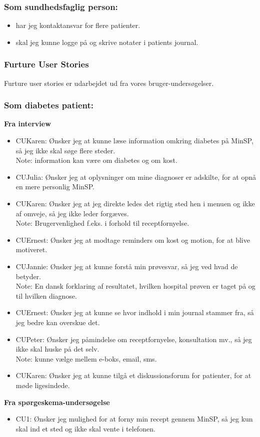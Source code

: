 \subsubsection*{Som sundhedsfaglig person:}
\begin{itemize}
\item har jeg kontaktansvar for flere patienter.
\item skal jeg kunne logge på og skrive notater i patients journal.
\end{itemize}
\subsubsection{Furture User Stories}
Furture user stories er udarbejdet ud fra vores bruger-undersøgelser.
\subsubsection*{Som diabetes patient:}
\textbf{Fra interview}\\
\begin{itemize}
\item CUKaren: Ønsker jeg at kunne læse information omkring diabetes på MinSP, så jeg ikke skal søge flere steder. \\
Note: information kan være om diabetes og om kost.
\item CUJulia: Ønsker jeg at oplysninger om mine diagnoser er adskilte, for at opnå en mere personlig MinSP. 
\item CUKaren: Ønsker jeg at jeg direkte ledes det rigtig sted hen i menuen og ikke af omveje, så jeg ikke leder forgæves.\\ 
Note: Brugervenlighed f.eks. i forhold til receptfornyelse.
\item CUErnest: Ønsker jeg at modtage reminders om kost og motion, for at blive motiveret.
\item CUJannie: Ønsker jeg at kunne forstå min prøvesvar, så jeg ved hvad de betyder. \\
Note: En dansk forklaring af resultatet, hvilken hospital prøven er taget på og til hvilken diagnose. 
\item CUErnest: Ønsker jeg at kunne se hvor indhold i min journal stammer fra, så jeg bedre kan overskue det.
\item CUPeter: Ønsker jeg påmindelse om receptfornyelse, konsultation mv., så jeg ikke skal huske på det selv.\\ 
Note: kunne vælge mellem e-boks, email, sms.
\item CUKaren: Ønsker jeg at kunne tilgå et diskussionsforum for patienter, for at møde ligesindede.
\end{itemize}
\textbf{Fra spørgeskema-undersøgelse}\\
\begin{itemize}
\item CU1: Ønsker jeg mulighed for at forny min recept gennem MinSP, så jeg kun skal ind et sted og ikke skal vente i telefonen.
\end{itemize}
%
